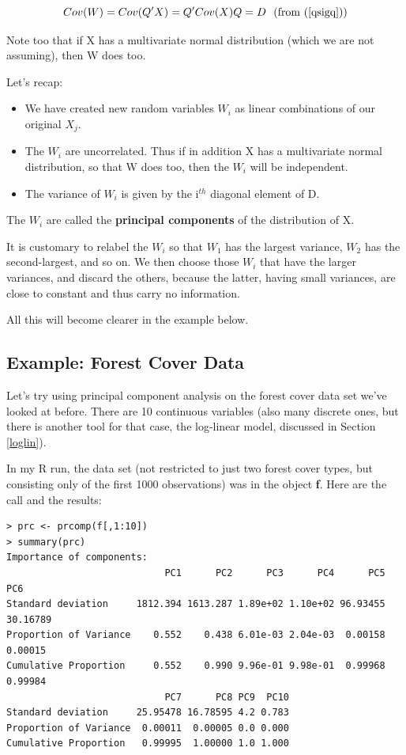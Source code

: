 \begin{equation}
Cov(W) = Cov(Q'X) = Q' Cov(X) Q = D ~~ \textrm{(from (\ref{qsigq}))}
\end{equation}

Note too that if X has a multivariate normal distribution (which we are
not assuming), then W does too.

Let's recap:

\begin{itemize}

\item We have created new random variables $W_i$ as linear combinations
of our original $X_j$.

\item The $W_i$ are uncorrelated.  Thus if in addition X has a
multivariate normal distribution, so that W does too, then the $W_i$
will be independent.

\item The variance of $W_i$ is given by the i$^{th}$ diagonal element of
D.

\end{itemize}

The $W_i$ are called the {\bf principal components} of the distribution
of X.

It is customary to relabel the $W_i$ so that $W_1$ has the largest
variance, $W_2$ has the second-largest, and so on.  We then choose those
$W_i$ that have the larger variances, and discard the others, because
the latter, having small variances, are close to constant and thus carry
no information.  

All this will become clearer in the example below.

\subsection{Example:  Forest Cover Data}

Let's try using principal component analysis on the forest cover data
set we've looked at before.  There are 10 continuous variables (also
many discrete ones, but there is another tool for that case, the
log-linear model, discussed in Section \ref{loglin}).

In my R run, the data set (not restricted to just two forest cover
types, but consisting only of the first 1000 observations) was in the
object {\bf f}.  Here are the call and the results:

\begin{Verbatim}[fontsize=\relsize{-2}]
> prc <- prcomp(f[,1:10])
> summary(prc)
Importance of components:
                            PC1      PC2      PC3      PC4      PC5 PC6
Standard deviation     1812.394 1613.287 1.89e+02 1.10e+02 96.93455 30.16789
Proportion of Variance    0.552    0.438 6.01e-03 2.04e-03  0.00158 0.00015
Cumulative Proportion     0.552    0.990 9.96e-01 9.98e-01  0.99968 0.99984
                            PC7      PC8 PC9  PC10
Standard deviation     25.95478 16.78595 4.2 0.783
Proportion of Variance  0.00011  0.00005 0.0 0.000
Cumulative Proportion   0.99995  1.00000 1.0 1.000
\end{Verbatim}

